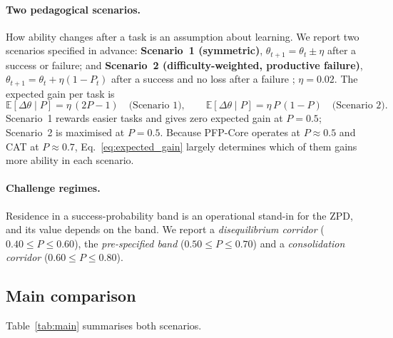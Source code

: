 \paragraph{Two pedagogical scenarios.} How ability changes after a task is an assumption about learning. We report two scenarios specified in advance: \textbf{Scenario~1 (symmetric)}, $\theta_{t+1} = \theta_t \pm \eta$ after a success or failure; and \textbf{Scenario~2 (difficulty-weighted, productive failure)}, $\theta_{t+1} = \theta_t + \eta(1 - P_t)$ after a success and no loss after a failure \cite{kapur2008productive}; $\eta = 0.02$. The expected gain per task is
\begin{equation}
\mathbb{E}[\Delta\theta \mid P] = \eta\,(2P - 1) \quad\text{(Scenario 1)}, \qquad \mathbb{E}[\Delta\theta \mid P] = \eta\,P\,(1 - P) \quad\text{(Scenario 2)} .
\label{eq:expected_gain}
\end{equation}
Scenario~1 rewards easier tasks and gives zero expected gain at $P = 0.5$; Scenario~2 is maximised at $P = 0.5$. Because PFP-Core operates at $P \approx 0.5$ and CAT at $P \approx 0.7$, Eq.~\eqref{eq:expected_gain} largely determines which of them gains more ability in each scenario.

\paragraph{Challenge regimes.} Residence in a success-probability band is an operational stand-in for the ZPD, and its value depends on the band. We report a \emph{disequilibrium corridor} ($0.40 \le P \le 0.60$), the \emph{pre-specified band} ($0.50 \le P \le 0.70$) and a \emph{consolidation corridor} ($0.60 \le P \le 0.80$).

\subsection{Main comparison}

\begin{table}[!t]
\centering
\caption{Main comparison ($N = \RaschN$ learners per condition, $T = \RaschT$ tasks; PFP-M1 and PFP-M2 with $\alpha = 1$). Band rows give the mean share of tasks whose true success probability lies in the band.}
\label{tab:main}
\resizebox{\textwidth}{!}{}
\end{table}

Table~\ref{tab:main} summarises both scenarios.

